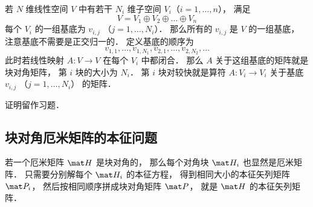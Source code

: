 
\begin{issues}
\issueDraft
\end{issues}

若 $N$ 维线性空间 $V$ 中有若干 $N_i$ 维子空间 $V_i$（$i=1,\dots,n$）， 满足
\begin{equation}
V = V_1 \oplus V_2 \oplus \dots \oplus V_n
\end{equation}
每个 $V_i$ 的一组基底为 $v_{i,j}$ （$j=1,\dots,N_i$）． 那么所有的 $v_{i,j}$ 是 $V$ 的一组基底， 注意基底不需要是正交归一的． 定义基底的顺序为
\begin{equation}
v_{1,1},\dots, v_{1,N_1}, v_{2,1}, \dots, v_{2,N_2}, \dots
\end{equation}
此时若线性映射 $A: V\to V$ 在每个 $V_i$ 中都闭合． 那么 $A$ 关于这组基底的矩阵就是块对角矩阵， 第 $i$ 块的大小为 $N_i$． 第 $i$ 块对较快就是算符 $A:V_i\to V_i$ 关于基底 $v_{i,j}$ （$j=1,\dots,N_i$） 的矩阵．

证明留作习题．

\subsection{块对角厄米矩阵的本征问题}
若一个厄米矩阵 $\mat H$ 是块对角的， 那么每个对角块 $\mat H_i$ 也显然是厄米矩阵． 只需要分别解每个 $\mat H_i$ 的本征方程， 得到相同大小的本征矢列矩阵 $\mat P_i$， 然后按相同顺序拼成块对角矩阵 $\mat P$， 就是 $\mat H$ 的本征矢列矩阵．
